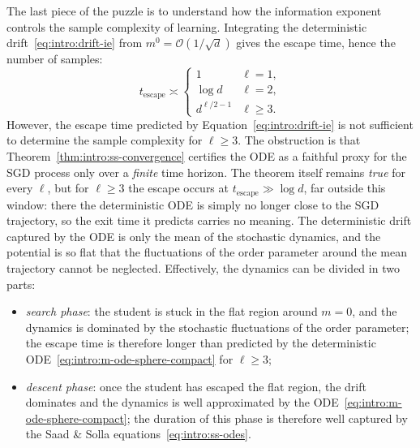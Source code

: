 The last piece of the puzzle is to understand how the information exponent controls the sample complexity of learning. Integrating the deterministic drift~\eqref{eq:intro:drift-ie} from \(m^0 = \mathcal{O}(1/\sqrt{d})\) gives the escape time, hence the number of samples:
\begin{equation} \label{eq:intro:info-scaling}
    t_\text{escape} \asymp \begin{cases}
        1 & \ell = 1, \\
        \log d & \ell = 2, \\
        d^{\ell/2-1} & \ell \geq 3.
    \end{cases}
\end{equation}
However, the escape time predicted by Equation~\eqref{eq:intro:drift-ie} is not sufficient to determine the sample complexity for \(\ell \geq 3\).
The obstruction is that Theorem~\ref{thm:intro:ss-convergence} certifies the ODE as a faithful proxy for the SGD process only over a \emph{finite} time horizon.
The theorem itself remains \emph{true} for every \(\ell\), but for \(\ell \geq 3\) the escape occurs at \(t_\text{escape} \gg \log d\), far outside this window: there the deterministic ODE is simply no longer close to the SGD trajectory, so the exit time it predicts carries no meaning. The deterministic drift captured by the ODE is only the mean of the stochastic dynamics, and the potential is so flat that the fluctuations of the order parameter around the mean trajectory cannot be neglected.
Effectively, the dynamics can be divided in two parts:
\begin{itemize}
    \item \emph{search phase}: the student is stuck in the flat region around \(m = 0\), and the dynamics is dominated by the stochastic fluctuations of the order parameter; the escape time is therefore longer than predicted by the deterministic ODE~\eqref{eq:intro:m-ode-sphere-compact} for \(\ell \geq 3\);
    \item \emph{descent phase}: once the student has escaped the flat region, the drift dominates and the dynamics is well approximated by the ODE~\eqref{eq:intro:m-ode-sphere-compact}; the duration of this phase is therefore well captured by the Saad \& Solla equations~\eqref{eq:intro:ss-odes}.
\end{itemize}
